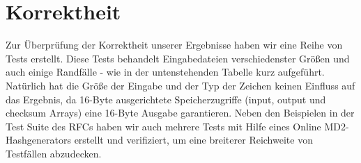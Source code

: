 \documentclass[course=erap]{aspdoc}
\begin{document}
\section{Korrektheit}

Zur Überprüfung der Korrektheit unserer Ergebnisse haben wir eine Reihe von Tests erstellt. Diese Tests behandelt Eingabedateien verschiedenster Größen und auch einige Randfälle - wie in der untenstehenden Tabelle kurz aufgeführt. Natürlich hat die Größe der Eingabe und der Typ der Zeichen keinen Einfluss auf das Ergebnis, da 16-Byte ausgerichtete Speicherzugriffe (input, output und checksum Arrays) eine 16-Byte Ausgabe garantieren. Neben den Beispielen in der Test Suite des RFCs \cite{rfc1319} haben wir auch mehrere Tests mit Hilfe eines Online MD2-Hashgenerators \cite{onlineHash} erstellt und verifiziert, um eine breiterer Reichweite von Testfällen abzudecken. 

\begin{table}[H]
\end{table}
\end{document}
